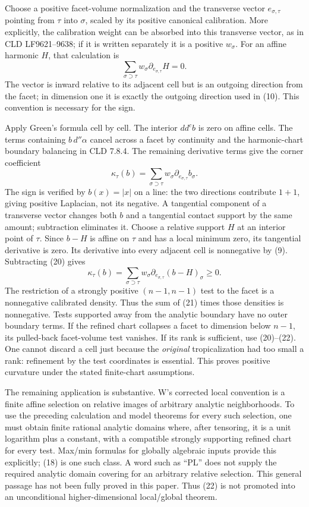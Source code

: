 \documentclass[
  11pt,
]{article}
\begin{document}
Choose a positive facet-volume normalization and the transverse vector
\(e_{\sigma,\tau}\) pointing from \(\tau\) into \(\sigma\), scaled by
its positive canonical calibration. More explicitly, the calibration
weight can be absorbed into this transverse vector, as in CLD
LF9621--9638; if it is written separately it is a positive \(w_\sigma\).
For an affine harmonic \(H\), that calculation is
\[\sum_{\sigma\supset\tau}w_\sigma\partial_{e_{\sigma,\tau}}H=0.        \tag{20}\]
The vector is inward relative to its adjacent cell but is an outgoing
direction from the facet; in dimension one it is exactly the outgoing
direction used in (10). This convention is necessary for the sign.

Apply Green's formula cell by cell. The interior \(dd^cb\) is zero on
affine cells. The terms containing \(b\,d''\alpha\) cancel across a
facet by continuity and the harmonic-chart boundary balancing in CLD
7.8.4. The remaining derivative terms give the corner coefficient
\[\kappa_\tau(b)=\sum_{\sigma\supset\tau}
                      w_\sigma\partial_{e_{\sigma,\tau}}b_\sigma.     \tag{21}\]
The sign is verified by \(b(x)=|x|\) on a line: the two directions
contribute \(1+1\), giving positive Laplacian, not its negative. A
tangential component of a transverse vector changes both \(b\) and a
tangential contact support by the same amount; subtraction eliminates
it. Choose a relative support \(H\) at an interior point of \(\tau\).
Since \(b-H\) is affine on \(\tau\) and has a local minimum zero, its
tangential derivative is zero. Its derivative into every adjacent cell
is nonnegative by (9). Subtracting (20) gives
\[\kappa_\tau(b)=\sum_{\sigma\supset\tau}
                w_\sigma\partial_{e_{\sigma,\tau}}(b-H)_\sigma\ge0.    \tag{22}\]
The restriction of a strongly positive \((n-1,n-1)\) test to the facet
is a nonnegative calibrated density. Thus the sum of (21) times those
densities is nonnegative. Tests supported away from the analytic
boundary have no outer boundary terms. If the refined chart collapses a
facet to dimension below \(n-1\), its pulled-back facet-volume test
vanishes. If its rank is sufficient, use (20)--(22). One cannot discard
a cell just because the \emph{original} tropicalization had too small a
rank: refinement by the test coordinates is essential. This proves
positive curvature under the stated finite-chart assumptions.

The remaining application is substantive. W's corrected local convention
is a finite affine selection on relative images of arbitrary analytic
neighborhoods. To use the preceding calculation and model theorems for
every such selection, one must obtain finite rational analytic domains
where, after tensoring, it is a unit logarithm plus a constant, with a
compatible strongly supporting refined chart for every test. Max/min
formulas for globally algebraic inputs provide this explicitly; (18) is
one such class. A word such as ``PL'' does not supply the required
analytic domain covering for an arbitrary relative selection. This
general passage has not been fully proved in this paper. Thus (22) is
not promoted into an unconditional higher-dimensional local/global
theorem.
\end{document}
